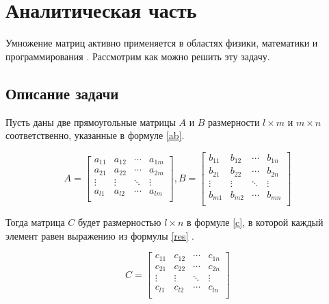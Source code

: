 \chapter{Аналитическая часть}

Умножение матриц активно применяется в областях физики, математики и программирования \cite{haskell}.
Рассмотрим как можно решить эту задачу.

\section{Описание задачи}

Пусть даны две прямоугольные матрицы $A$ и $B$ размерности $l \times m$ и $m \times n$ соответственно, указанные в формуле \ref{ab}.

\begin{equation}\label{ab}
	A =
	\left[
	\begin{matrix}
		a_{11} & a_{12} & \cdots & a_{1m} \\
		a_{21} & a_{22} & \cdots & a_{2m} \\
		\vdots & \vdots & \ddots & \vdots \\
		a_{l1} & a_{l2} & \cdots & a_{lm} \\
	\end{matrix}
	\right],
	B =
	\left[
	\begin{matrix}
		b_{11} & b_{12} & \cdots & b_{1n} \\
		b_{21} & b_{22} & \cdots & b_{2n} \\
		\vdots & \vdots & \ddots & \vdots \\
		b_{m1} & b_{m2} & \cdots & b_{mn} \\
	\end{matrix}
	\right]
\end{equation}

Тогда матрица $C$ будет размерностью $l \times n$ в формуле \ref{c}, в которой каждый элемент равен выражению из формулы \ref{res} \cite{litr}.

\begin{equation}\label{c}
	C =
	\left[
	\begin{matrix}
		c_{11} & c_{12} & \cdots & c_{1n} \\
		c_{21} & c_{22} & \cdots & c_{2n} \\
		\vdots & \vdots & \ddots & \vdots \\
		c_{l1} & c_{l2} & \cdots & c_{ln} \\
	\end{matrix}
	\right]
\end{equation}

